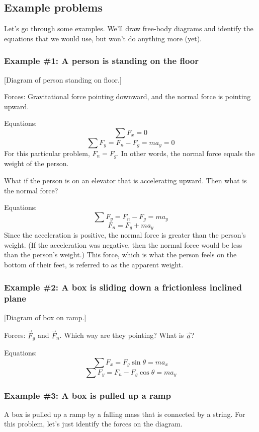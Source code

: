 \subsection{Example problems}
Let's go through some examples. We'll draw free-body diagrams and identify the equations that we would use, but won't do anything more (yet).

\subsubsection*{Example \#1: A person is standing on the floor}
[Diagram of person standing on floor.]
\vspace{4cm}           


Forces: Gravitational force pointing downward, and the normal force is pointing upward.

Equations:
$$\sum F_x=0$$
$$\sum F_y=F_n-F_g=ma_y=0$$
For this particular problem, $F_n=F_g$. In other words, the normal force equals the weight of the person.

What if the person is on an elevator that is accelerating upward. Then what is the normal force?

\vspace{4cm}

Equations:
$$\sum F_y=F_n-F_g=ma_y$$
$$F_n = F_g+ma_y$$
Since the acceleration is positive, the normal force is greater than the person's weight. (If the acceleration was negative, then the normal force would be less than the person's weight.) This force, which is what the person feels on the bottom of their feet, is referred to as the apparent weight.

\subsubsection*{Example \#2: A box is sliding down a frictionless inclined plane}
[Diagram of box on ramp.]
\vspace{4cm}

Forces: $\vec{F}_g$ and $\vec{F}_n$. Which way are they pointing? What is $\vec{a}$?

Equations:
$$\sum F_x=F_g\sin\theta = ma_x$$
$$\sum F_y=F_n-F_g\cos\theta = ma_y$$

\subsubsection*{Example \#3: A box is pulled up a ramp}
A box is pulled up a ramp by a falling mass that is connected by a string. For this problem, let's just identify the forces on the diagram.

